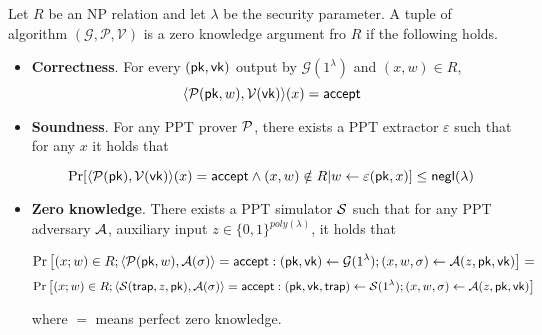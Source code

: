\begin{definition}\label{def::zkpd}
	
	Let $R$ be an NP relation and let $\lambda$ be the security parameter. A tuple of algorithm $(\mathcal{G}, \mathcal{P}, \mathcal{V})$ is a zero knowledge argument fro $R$ if the following holds.
	
	\begin{itemize}
		
		\item \textbf{Correctness}. For every $(\pk, \vk)$ output by $\mathcal{G}(1^\lambda)$ and $(x, w) \in R$, 
		$$\langle \P(\pk, w), \V(\vk) \rangle(x) = \accept$$
		
		\item \textbf{Soundness}. For any PPT prover $\P$, there exists a PPT extractor $\varepsilon$ such that for any $x$ it holds that
		
		$$\Pr[\langle\P(\pk), \V(\vk) \rangle(x) = \accept \wedge (x, w) \notin R | w \leftarrow \varepsilon(\pk, x)] \leq \neg(\lambda)$$
		
		\item \textbf{Zero knowledge}. There exists a PPT simulator $\S$ such that for any PPT adversary $\A$, auxiliary input $z \in \{0, 1\}^{poly(\lambda)}$, it holds that
		
		$$\Pr\left[(x;w)\in R; \langle\P(\pk,w),\A(\sigma) \rangle=\accept: (\pk,\vk)\leftarrow\mathcal{G}(1^\lambda); (x,w,\sigma)\leftarrow\A(z,\pk,\vk) \right] = $$
		$$\Pr\left[(x;w)\in R; \langle\S(\mathsf{trap}, z, \pk),\A(\sigma) \rangle=\accept:(\pk,\vk,\mathsf{trap})\leftarrow\S(1^\lambda); (x,w,\sigma)\leftarrow\A(z,\pk,\vk)\right]$$
		
		where $=$ means perfect zero knowledge. 
		
	\end{itemize}
	
\end{definition}



